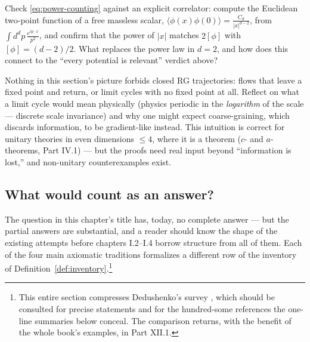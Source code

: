 \begin{exercise}[medium]
\label{exr:free-scalar-dim}
Check \eqref{eq:power-counting} against an explicit correlator: compute the
Euclidean two-point function of a free massless scalar, $\langle \phi(x) \phi(0)
\rangle = \frac{C_d}{|x|^{d-2}}$, from $\int d^dp \, \frac{e^{ip\cdot x}}{p^2}$,
and confirm that the power of $|x|$ matches $2[\phi]$ with $[\phi] = (d-2)/2$.
What replaces the power law in $d = 2$, and how does this connect to the ``every
potential is relevant'' verdict above?
\end{exercise}

\begin{exercise}[thinker]
\label{exr:irreversibility}
Nothing in this section's picture forbids closed RG trajectories: flows that
leave a fixed point and return, or limit cycles with no fixed point at all.
Reflect on what a limit cycle would mean physically (physics periodic in the
\emph{logarithm} of the scale --- discrete scale invariance) and why one might
expect coarse-graining, which discards information, to be gradient-like instead.
This intuition is correct for unitary theories in even dimensions $\le 4$, where
it is a theorem ($c$- and $a$-theorems, Part IV.1) --- but the proofs need real
input beyond ``information is lost,'' and non-unitary counterexamples exist.
\end{exercise}

\subsection{What would count as an answer?}
\label{sec:answer}

The question in this chapter's title has, today, no complete answer --- but the
partial answers are substantial, and a reader should know the shape of the
existing attempts before chapters I.2--I.4 borrow structure from all of them.
Each of the four main axiomatic traditions formalizes a different row of the
inventory of Definition~\ref{def:inventory}.\footnote{This entire section
compresses Dedushenko's survey , which should be consulted for
precise statements and for the hundred-some references the one-line summaries
below conceal. The comparison returns, with the benefit of the whole book's
examples, in Part XII.1.}


